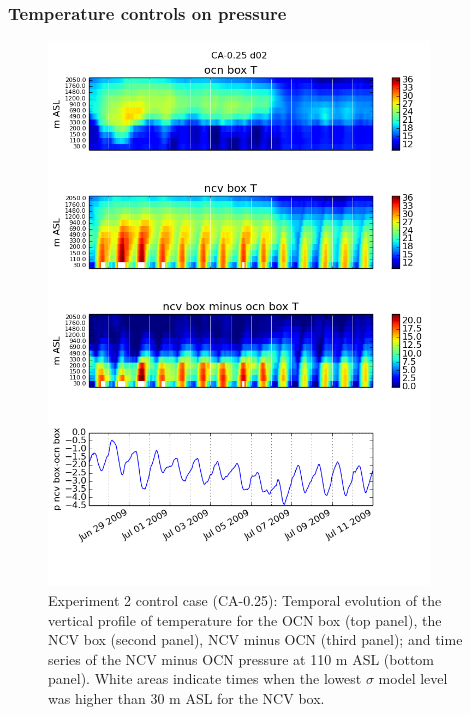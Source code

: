 \subsubsection{Temperature controls on pressure}

\begin{figure}[here]
\includegraphics[width=0.9\textwidth]{ch3-wind/img/timeheight_T_pdiff_ocnbox_ncvbox_0pt25.png}
\caption{Experiment 2 control case (CA-0.25): Temporal evolution of the vertical profile of temperature for the OCN box (top panel), the NCV box (second panel), NCV minus OCN (third panel); and time series of the NCV minus OCN pressure at 110 m ASL (bottom panel).  White areas indicate times when the lowest $\sigma$ model level was higher than 30 m ASL for the NCV box.}
\label{fig:windSol_TimeHeightCtrl}
\end{figure}

